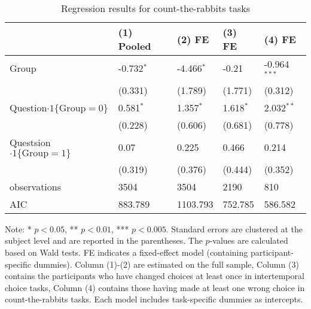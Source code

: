 \documentclass[12pt]{article}
\begin{document}
\begin{table}
    \caption{Regression results for count-the-rabbits tasks}
    \vspace*{12pt}
    \centering

      \begin{tabular}{lllll}
\hline
 & (1) Pooled & (2) FE & (3) FE & (4) FE \\
\hline
Group & -0.732$^{*}$ & -4.466$^{*}$ & -0.21 & -0.964$^{***}$ \\
 & (0.331) & (1.789) & (1.771) & (0.312) \\
Question$\cdot1\{\text{Group}=0\}$ & 0.581$^{*}$ & 1.357$^{*}$ & 1.618$^{*}$ & 2.032$^{**}$ \\
 & (0.228) & (0.606) & (0.681) & (0.778) \\
Questsion$\cdot1\{\text{Group}=1\}$ & 0.07 & 0.225 & 0.466 & 0.214 \\
 & (0.319) & (0.376) & (0.444) & (0.352) \\\hline

observations & 3504 & 3504 & 2190 & 810 \\
AIC & 883.789 & 1103.793 & 752.785 & 586.582 \\
\hline
\end{tabular}

    \vspace*{4pt}
    \centering
    \begin{minipage}{0.85\textwidth}
    {\par\footnotesize Note: * $p<0.05$, ** $p<0.01$, *** $p<0.005$. Standard errors are clustered at the subject level and are reported in the parentheses. The $p$-values are calculated based on Wald tests. FE indicates a fixed-effect model (containing participant-specific dummies). Column (1)-(2) are estimated on the full sample, Column (3) contains the participants who have changed choices at least once in intertemporal choice tasks, Column (4) contains those having made at least one wrong choice in count-the-rabbits tasks. Each model includes task-specific dummies as intercepts. }
    \end{minipage}
    \label{tab:exp3_reg_rabbit_choice}
\end{table}
\end{document}
